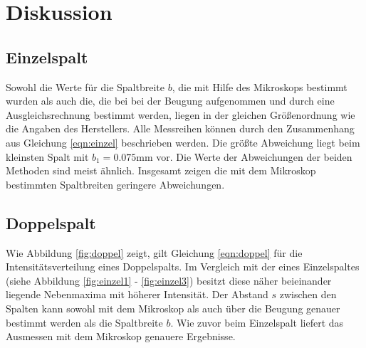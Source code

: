 \section{Diskussion}
\label{sec:Diskussion}

\subsection{Einzelspalt}
Sowohl die Werte für die Spaltbreite $b$, die mit Hilfe des Mikroskops bestimmt wurden als auch die, die bei bei der Beugung aufgenommen und durch eine Ausgleichsrechnung bestimmt werden, liegen in der gleichen Größenordnung wie die Angaben des Herstellers. Alle Messreihen können durch den Zusammenhang aus Gleichung \ref{eqn:einzel} beschrieben werden. Die größte Abweichung liegt  beim kleinsten Spalt mit $b_1=0.075 \si{\milli\meter}$ vor. Die Werte der Abweichungen der beiden Methoden sind meist ähnlich. Insgesamt zeigen die mit dem Mikroskop bestimmten Spaltbreiten geringere Abweichungen.

\subsection{Doppelspalt}
Wie Abbildung \ref{fig:doppel} zeigt, gilt Gleichung \ref{eqn:doppel} für die Intensitätsverteilung eines Doppelspalts. Im Vergleich mit der eines Einzelspaltes (siehe Abbildung \ref{fig:einzel1} -  \ref{fig:einzel3}) besitzt diese näher beieinander liegende Nebenmaxima mit höherer Intensität. Der Abstand $s$ zwischen den Spalten kann sowohl mit dem Mikroskop als auch über die Beugung genauer bestimmt werden als die Spaltbreite $b$. Wie zuvor beim Einzelspalt liefert das Ausmessen mit dem Mikroskop genauere Ergebnisse.
